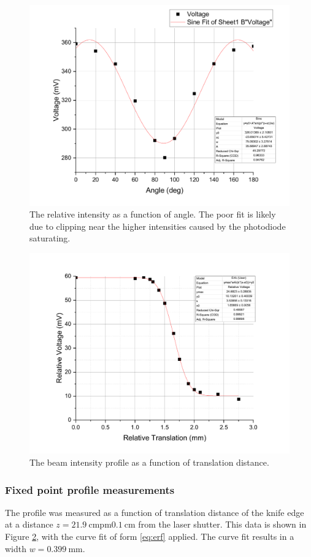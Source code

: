 \documentclass[notitlepage]{report}
\begin{document}
	\begin{figure}[p]
		\centering
		\includegraphics[width=0.7\linewidth]{lab4_polarizer}
		\caption{The relative intensity as a function of angle. The poor fit is likely due to clipping near the higher intensities caused by the photodiode saturating.}
		\label{fig:lab4polarizer}
	\end{figure}

	
\begin{figure}[p]
	\centering
	\includegraphics[width=0.9\linewidth]{lab4_erfc}
	\caption{The beam intensity profile as a function of translation distance.}
	\label{fig:lab4erfc}
\end{figure}	
	
	\subsubsection{Fixed point profile measurements}
	The profile was measured as a function of translation distance of the knife edge at a distance $z=\SI{21.9}{\centi\meter \pm \SI{0.1}{\centi\meter}}$ from the laser shutter. This data is shown in Figure \ref{fig:lab4erfc}, with the curve fit of form \eqref{eq:erf} applied. The curve fit results in a width $w=\SI{0.399}{\mm}$.
\end{document}
